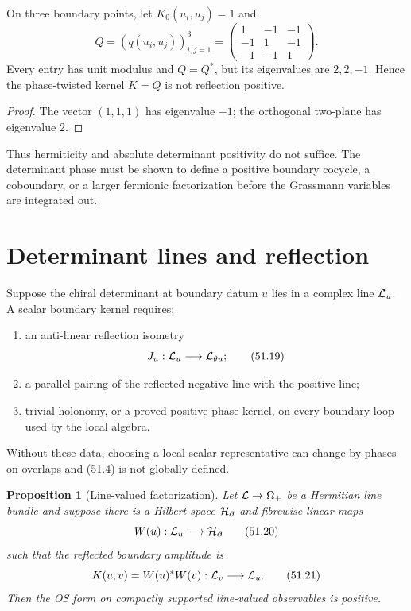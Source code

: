 \documentclass[11pt]{article}
\newtheorem{proposition}[theorem]{Proposition}
\theoremstyle{remark}
\begin{document}
\begin{countertheorem}
\label{cth:v15v51-phase}
On three boundary points, let \(K_0(u_i,u_j)=1\) and
\[
 Q=(q(u_i,u_j))_{i,j=1}^3=
 \begin{pmatrix}
 1&-1&-1\\
 -1&1&-1\\
 -1&-1&1
 \end{pmatrix}.                                         \tag{51.18}
\]
Every entry has unit modulus and \(Q=Q^*\), but its eigenvalues are
\(2,2,-1\).  Hence the phase-twisted kernel \(K=Q\) is not
reflection positive.
\end{countertheorem}

\begin{proof}
The vector \((1,1,1)\) has eigenvalue \(-1\); the orthogonal
two-plane has eigenvalue \(2\).
\end{proof}

Thus hermiticity and absolute determinant positivity do not suffice.
The determinant phase must be shown to define a positive boundary
cocycle, a coboundary, or a larger fermionic factorization before
the Grassmann variables are integrated out.

\section{Determinant lines and reflection}

Suppose the chiral determinant at boundary datum \(u\) lies in a
complex line \({\cal L}_u\).  A scalar boundary kernel requires:
\begin{enumerate}
\item an anti-linear reflection isometry
      \[
       J_u:{\cal L}_u\longrightarrow{\cal L}_{\theta u}; \tag{51.19}
      \]
\item a parallel pairing of the reflected negative line with the
      positive line;
\item trivial holonomy, or a proved positive phase kernel, on every
      boundary loop used by the local algebra.
\end{enumerate}
Without these data, choosing a local scalar representative can
change by phases on overlaps and (51.4) is not globally defined.

\begin{proposition}[Line-valued factorization]
\label{prop:v15v51-line}
Let \({\cal L}\to\Omega_+\) be a Hermitian line bundle and suppose
there is a Hilbert space \({\cal H}_\partial\) and fibrewise linear
maps
\[
 W(u):{\cal L}_u\longrightarrow{\cal H}_\partial        \tag{51.20}
\]
such that the reflected boundary amplitude is
\[
 K(u,v)=W(u)^*W(v):
 {\cal L}_v\longrightarrow{\cal L}_u.                  \tag{51.21}
\]
Then the OS form on compactly supported line-valued observables is
positive.
\end{proposition}
\end{document}
